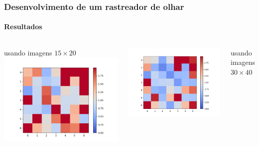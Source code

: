 \documentclass[11pt]{beamer}
\begin{document}
\begin{frame}
\frametitle{Desenvolvimento de um rastreador de olhar}
\framesubtitle{Resultados}


\begin{columns}[t]
\centering
\tiny{usando imagens $15 \times 20$}
\includegraphics[scale=.25]{imagens/erros5pyrDown.png}

\includegraphics[scale=.25]{imagens/erros4pyrDown.png}

\tiny{usando imagens $30 \times 40$}


\end{columns}
\end{frame}
\end{document}
